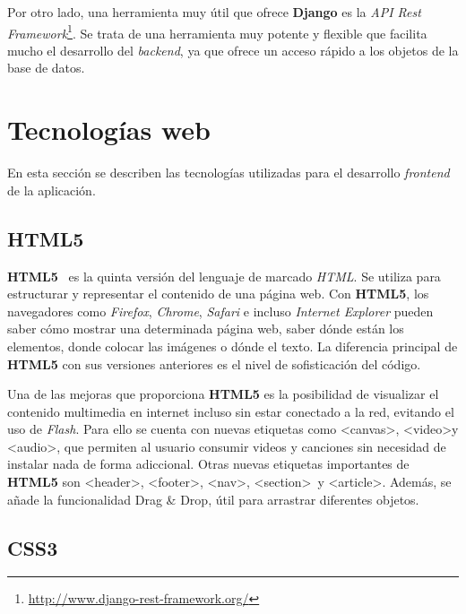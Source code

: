 \documentclass[a4paper, 12pt]{book}
\begin{document}
Por otro lado, una herramienta muy útil que ofrece \textbf{Django} es la \textit{API Rest Framework}\footnote{\url{http://www.django-rest-framework.org/}}. Se trata de una herramienta muy potente y flexible que facilita mucho el desarrollo del \textit{backend}, ya que ofrece un acceso rápido a los objetos de la base de datos.


\section{Tecnologías web} 
\label{sec:tecnologias-web}

En esta sección se describen las tecnologías utilizadas para el desarrollo \textit{frontend} de la aplicación.

\subsection{HTML5} 
\label{subsec:html5}

\textbf{HTML5}~\cite{pagina-html5} es la quinta versión del lenguaje de marcado \textit{HTML}. Se utiliza para estructurar y representar el contenido de una página web. Con \textbf{HTML5}, los navegadores como \textit{Firefox}, \textit{Chrome}, \textit{Safari} e incluso \textit{Internet Explorer} pueden saber cómo mostrar una determinada página web, saber dónde están los elementos, donde colocar las imágenes o dónde el texto. La diferencia principal de \textbf{HTML5} con sus versiones anteriores es el nivel de sofisticación del código.
\newline

Una de las mejoras que proporciona \textbf{HTML5} es la posibilidad de visualizar el contenido multimedia en internet incluso sin estar conectado a la red, evitando el uso de \textit{Flash}. Para ello se cuenta con nuevas etiquetas como \textless  canvas\textgreater, \textless  video\textgreater y \textless  audio\textgreater, que permiten al usuario consumir videos y canciones sin necesidad de instalar nada de forma adiccional. Otras nuevas etiquetas importantes de \textbf{HTML5} son \textless  header\textgreater, \textless  footer\textgreater, \textless  nav\textgreater, \textless  section\textgreater ~y \textless  article\textgreater. Además, se añade la funcionalidad Drag \& Drop, útil para arrastrar diferentes objetos.

\subsection{CSS3} 
\label{subsec:css3}
\end{document}
